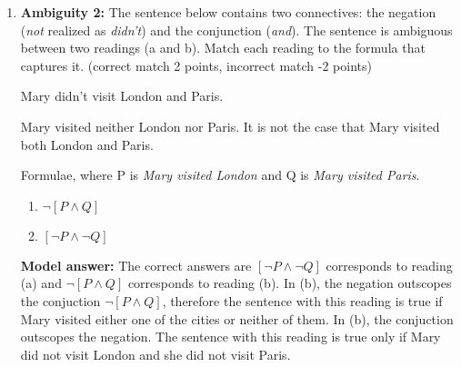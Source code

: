 \documentclass[a4,11pt]{article}
\newcommand{\6}{\mbox{$[\hspace*{-.6mm}[$}}
\newcommand{\9}{\mbox{$]\hspace*{-.6mm}]$}}
\begin{document}
\begin{enumerate}[leftmargin = 12pt]
\item  {\bf Ambiguity 2:} The sentence below contains two connectives: the negation (\textit{not} realized as \textit{didn't}) and the conjunction (\textit{and}). The sentence is ambiguous between two readings (a and b). Match each reading to the formula that captures it. (correct match 2 points, incorrect match -2 points)

\begin{exe}
\ex Mary didn't visit London and Paris.
\begin{xlist}
\ex Mary visited neither London nor Paris.
\ex It is not the case that Mary visited both London and Paris.
\end{xlist}
\end{exe}

Formulae, where P is \textit{Mary visited London} and Q is \textit{Mary visited Paris}. 
\begin{enumerate}[noitemsep]
\item $\neg [P \land Q ]$
\item $[\neg P \land \neg Q]$
\end{enumerate}

{ \bf Model answer:}  The correct answers are $[\neg P \land \neg Q]$ corresponds to reading (a) and $\neg [P \land Q ]$ corresponds to reading (b). In (b), the negation outscopes the conjuction $\neg [P \land Q ]$, therefore the sentence with this reading is true if Mary visited either one of the cities or neither of them. In (b), the conjuction outscopes the negation. The sentence with this reading is true only if Mary did not visit London and she did not visit Paris.


\end{enumerate}
\end{document}
